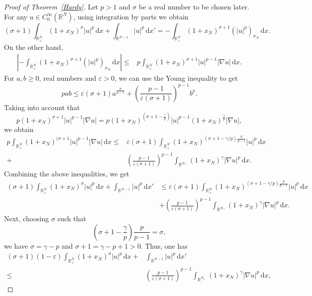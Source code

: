 \documentclass[12pt,reqno]{amsart}
\begin{document}
\begin{proof}[Proof of Theorem~\ref{Hardy}]  Let $p>1$ and $\sigma$ be a real number to be chosen later. For any $u\in C_0^\infty(\mathds{R}^N)$, using integration by parts we obtain
\[
(\sigma+1)\int_{\mathds{R}^N_+}(1+x_N)^{\sigma}|u|^p \, \mathrm{d} x +\int_{\mathds{R}^{N-1}}|u|^p\, \mathrm{d} x'=-\int_{\mathds{R}^N_+}(1+x_N)^{\sigma+1}(|u|^p)_{x_N}\, \mathrm{d} x.
\]
On the other hand, 
$$
\begin{aligned}
\left|-\int_{\mathds{R}^N_+}(1+x_N)^{\sigma+1}(|u|^p)_{x_N}\, \mathrm{d} x\right|
			\leq &p\int_{\mathds{R}^N_+}(1+x_N)^{\sigma+1}|u|^{p-1}|\nabla u| \, \mathrm{d} x.
\end{aligned}
 $$
 For $a,b\geq0$, real numbers and $\varepsilon>0$, we can use the Young inequality to get
		$$
		pab\leq \varepsilon(\sigma+1)a^{\frac{p}{p-1}}+\left(\frac{p-1}{\varepsilon(\sigma+1)}\right)^{p-1}b^p.
		$$
Taking into account that 
 $$
 p(1+x_N)^{\sigma+1}|u|^{p-1}|\nabla u|=p(1+x_N)^{(\sigma+1-\frac{\gamma}{p})}|u|^{p-1}(1+x_N)^{\frac{\gamma}{p}}|\nabla u|,
 $$
we  obtain 
		\begin{align*}
			p\int_{\mathds{R}^N_+}(1+x_N)^{(\sigma+1}|u|^{p-1}|\nabla u|\, \mathrm{d} x\leq&\varepsilon(\sigma+1)\int_{\mathds{R}^N_+}(1+x_N)^{(\sigma+1-\gamma/p)\frac{p}{p-1}}|u|^p\, \mathrm{d} x\\
			+&\left(\frac{p-1}{\varepsilon(\sigma+1)}\right)^{p-1}\int_{\mathds{R}^{N_+}}(1+x_N)^\gamma|\nabla u|^p \, \mathrm{d} x.
		\end{align*}
		Combining the above inequalities, we get
		\begin{align*}
			(\sigma+1)\int_{\mathds{R}^N_+}(1+x_N)^{\sigma}|u|^p \, \mathrm{d} x+	\int_{\mathds{R}^{N-1}}|u|^{p}\, \mathrm{d} x'&\leq \varepsilon(\sigma+1)\int_{\mathds{R}^N_+}(1+x_N)^{(\sigma+1-\gamma/p)\frac{p}{p-1}}|u|^p\, \mathrm{d} x\\
			&+\left(\frac{p-1}{\varepsilon(\sigma+1)}\right)^{p-1}\int_{\mathds{R}^{N_+}}(1+x_N)^\gamma|\nabla u|^p \, \mathrm{d} x.
		\end{align*}
		Next, choosing $\sigma$ such that 
		$$
		\left(\sigma+1-\frac{\gamma}{p}\right)\frac{p}{p-1}=\sigma,
		$$
		we have  $\sigma=\gamma-p$ and $\sigma+1=\gamma-p+1>0$. Thus, one has
		$$
		\begin{aligned}	(\sigma+1)(1-\varepsilon)\int_{\mathds{R}^N_+}(1+x_N)^{\sigma}|u|^p\, \mathrm{d} x+&	\int_{\mathds{R}^{N-1}}|u|^{p}\, \mathrm{d} x'\\
			\leq& \left(\frac{p-1}{\varepsilon(\sigma+1)}\right)^{p-1}\int_{\mathds{R}^{N_+}}(1+x_N)^\gamma|\nabla u|^p \, \mathrm{d} x,

\end{aligned}$$
\end{proof}
\end{document}
